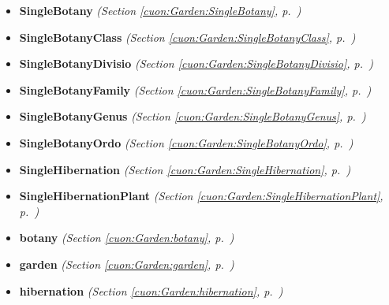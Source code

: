 \begin{itemize}
\setlength{\parskip}{0ex}
\item \textbf{SingleBotany}
  \textit{(Section \ref{cuon:Garden:SingleBotany}, p.~\pageref{cuon:Garden:SingleBotany})}

\item \textbf{SingleBotanyClass}
  \textit{(Section \ref{cuon:Garden:SingleBotanyClass}, p.~\pageref{cuon:Garden:SingleBotanyClass})}

\item \textbf{SingleBotanyDivisio}
  \textit{(Section \ref{cuon:Garden:SingleBotanyDivisio}, p.~\pageref{cuon:Garden:SingleBotanyDivisio})}

\item \textbf{SingleBotanyFamily}
  \textit{(Section \ref{cuon:Garden:SingleBotanyFamily}, p.~\pageref{cuon:Garden:SingleBotanyFamily})}

\item \textbf{SingleBotanyGenus}
  \textit{(Section \ref{cuon:Garden:SingleBotanyGenus}, p.~\pageref{cuon:Garden:SingleBotanyGenus})}

\item \textbf{SingleBotanyOrdo}
  \textit{(Section \ref{cuon:Garden:SingleBotanyOrdo}, p.~\pageref{cuon:Garden:SingleBotanyOrdo})}

\item \textbf{SingleHibernation}
  \textit{(Section \ref{cuon:Garden:SingleHibernation}, p.~\pageref{cuon:Garden:SingleHibernation})}

\item \textbf{SingleHibernationPlant}
  \textit{(Section \ref{cuon:Garden:SingleHibernationPlant}, p.~\pageref{cuon:Garden:SingleHibernationPlant})}

\item \textbf{botany}
  \textit{(Section \ref{cuon:Garden:botany}, p.~\pageref{cuon:Garden:botany})}

\item \textbf{garden}
  \textit{(Section \ref{cuon:Garden:garden}, p.~\pageref{cuon:Garden:garden})}

\item \textbf{hibernation}
  \textit{(Section \ref{cuon:Garden:hibernation}, p.~\pageref{cuon:Garden:hibernation})}

\end{itemize}



